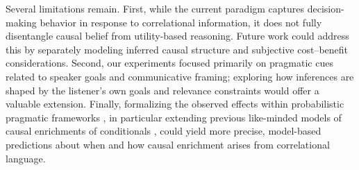 \documentclass[10pt,letterpaper]{article}
\begin{document}



Several limitations remain. First, while the current paradigm captures decision-making behavior in response to correlational information, it does not fully disentangle causal belief from utility-based reasoning. Future work could address this by separately modeling inferred causal structure and subjective cost–benefit considerations. Second, our experiments focused primarily on pragmatic cues related to speaker goals and communicative framing; exploring how inferences are shaped by the listener’s own goals and relevance constraints would offer a valuable extension. Finally, formalizing the observed effects within probabilistic pragmatic frameworks \citep{goodman2016pragmatic,ScontrasTessler2021:A-practical-int,Degen2023:The-Rational-Sp}, in particular extending previous like-minded models of causal enrichments of conditionals \citep{grusdt_probabilistic_2022}, could yield more precise, model-based predictions about when and how causal enrichment arises from correlational language.
\end{document}
